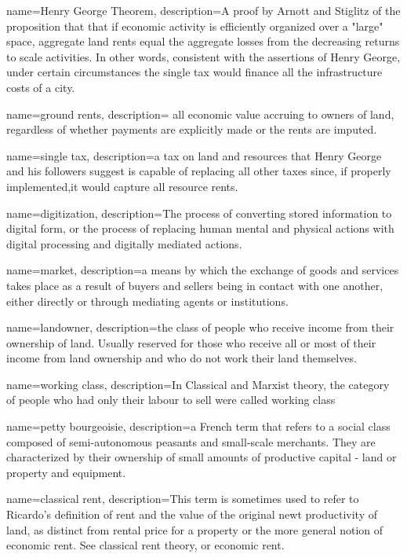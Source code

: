 {
name=Henry George Theorem,
description={A proof by Arnott and Stiglitz \cite{arnottAggregateLandRents1979} of the proposition that  that if economic activity is efficiently organized over a "large" space, aggregate land rents equal the aggregate losses from the decreasing returns to scale activities. In other words, consistent with the assertions of Henry George, under certain circumstances the \gls{single tax} would finance all the infrastructure costs of a city. }
}

{
name=ground rents,
description={ all economic value accruing to owners of land, regardless of whether payments are explicitly made or the rents are imputed.}
}

{
name=single tax,
description={a tax on land and resources that Henry George and his followers suggest is capable of replacing all other taxes since, if properly implemented,it would capture all resource rents. }
}

{
name=digitization,
description={The process of converting stored information to digital form, or the process of replacing human mental and physical actions with digital processing and digitally mediated actions.}
}

{
name=market,
description={a means by which the exchange of goods and services takes place as a result of buyers and sellers being in contact with one another, either directly or through mediating agents or institutions.}%
}

{
name=landowner,
description={the class of people who receive income from their ownership of land. Usually reserved for those who receive all or most of their income from land ownership and who do not work their land themselves.}
}

{
name=working class,
description={In Classical and Marxist theory, the category of people who had only their labour to sell were called working class}
}


{
name=petty bourgeoisie,
description={a French term that refers to a social class composed of semi-autonomous peasants and small-scale merchants. They are characterized by their ownership of small amounts of productive capital - land or property and equipment.}
}

{
name=classical rent,
description={This term is sometimes used to refer to Ricardo's definition of rent and the value of the original newt productivity of land, as distinct from rental price for a property or the more general notion of economic rent. See \gls{classical rent theory}, or \gls{economic rent}.}
}

